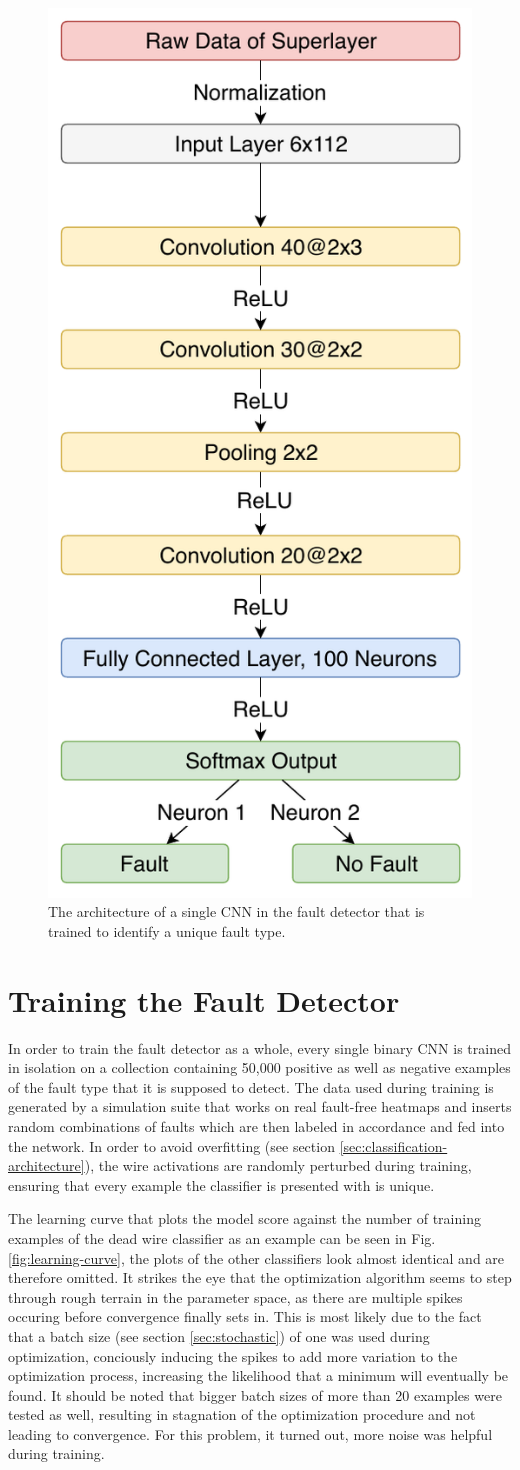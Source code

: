 \begin{figure}[h]
  \centering
  \includegraphics[width=.4\textwidth]{../figures/fault_architecture}
  \caption{The architecture of a single CNN in the fault detector that
  is trained to identify a unique fault type.}
  \label{fig:fault-architecture}
\end{figure}

\section{Training the Fault Detector}

In order to train the fault detector as a whole, every single binary
CNN is trained in isolation on a collection containing 50,000 positive
as well as negative examples of the fault type that it is supposed to
detect. The data used during training is
generated by a simulation suite that works on real fault-free heatmaps
and inserts random combinations of faults which are then labeled in
accordance and fed into the network. In order to avoid overfitting
(see section \ref{sec:classification-architecture}), the wire activations
are randomly perturbed during training, ensuring that every example
the classifier is presented with is unique.

The learning curve that plots the model score against the
number of training examples of the dead wire classifier as an example
can be seen in Fig. \ref{fig:learning-curve}, the plots of the other
classifiers look almost identical and are therefore omitted. It
strikes the eye that the optimization algorithm seems to step through
rough terrain in the parameter space, as there are multiple spikes
occuring before convergence finally sets in. This is most likely due
to the fact that a batch size (see section \ref{sec:stochastic}) of
one was used during optimization, conciously inducing the spikes to
add more variation to the optimization process, increasing
the likelihood that a minimum will eventually be found. It should be
noted that bigger batch sizes of more than 20 examples were tested as
well, resulting in stagnation of the optimization procedure and not
leading to convergence. For this problem, it turned out, more noise
was helpful during training.

